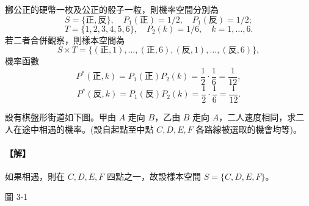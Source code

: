 \medskip
\begin{example}\label{ex:b5-4-17}
擲公正的硬幣一枚及公正的骰子一粒，則機率空間分別為
\[
S = \{\text{正}, \text{反}\}, \quad P_1(\text{正}) = 1/2, \quad P_1(\text{反}) = 1/2;
\]
\[
T = \{1, 2, 3, 4, 5, 6\}, \quad P_2(k) = 1/6, \quad k = 1, \dots, 6.
\]
若二者合併觀察，則樣本空間為
\[
S \times T = \{(\text{正}, 1), \dots, (\text{正}, 6), (\text{反}, 1), \dots, (\text{反}, 6)\},
\]
機率函數
\[
P^*(\text{正}, k) = P_1(\text{正}) P_2(k) = \frac{1}{2} \cdot \frac{1}{6} = \frac{1}{12},
\]
\[
P^*(\text{反}, k) = P_1(\text{反}) P_2(k) = \frac{1}{2} \cdot \frac{1}{6} = \frac{1}{12}.
\]
\end{example}

\medskip
\noindent
\begin{minipage}[c]{0.56\textwidth}
\begin{example}\label{ex:b5-4-18}
設有棋盤形街道如下圖。甲由 $A$ 走向 $B$，乙由 $B$ 走向 $A$，二人速度相同，求二人在途中相遇的機率。(設自起點至中點 $C, D, E, F$ 各路線被選取的機會均等)。
\end{example}
\paragraph{【解】}
如果相遇，則在 $C, D, E, F$ 四點之一，故設樣本空間 $S = \{C, D, E, F\}$。
\end{minipage}\hfill
\begin{minipage}[c]{0.40\textwidth}
\centering
{}
\par\vspace{0.4em}
{\small 圖 3-1\footnotemark}
\end{minipage}%
\label{note:b5-ch4-p136-fig-num}

